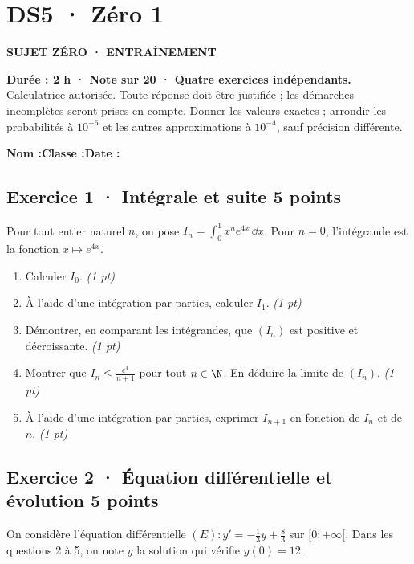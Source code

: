 \clearpage{}\label{sujet:7-1}

\section*{DS5 · Zéro 1}

{\sffamily\bfseries\color{teal}SUJET ZÉRO · ENTRAÎNEMENT\par}

\textbf{Durée : 2 h · Note sur 20 · Quatre exercices indépendants.}\\Calculatrice autorisée. Toute réponse doit être justifiée ; les démarches incomplètes seront prises en compte. Donner les valeurs exactes ; arrondir les probabilités à $10^{-6}$ et les autres approximations à $10^{-4}$, sauf précision différente.

\smallskip\textbf{Nom :}\enspace\dotfill\quad\textbf{Classe :}\enspace\dotfill\quad\textbf{Date :}\enspace\dotfill

\subsection*{Exercice 1 · Intégrale et suite \hfill 5 points}Pour tout entier naturel $n$, on pose $I_n=\displaystyle\int_0^1x^ne^{4x}\,\dd x$. Pour $n=0$, l'intégrande est la fonction $x\mapsto e^{4x}$.

\begin{enumerate}

\item Calculer $I_0$. \hfill\textit{(1 pt)}

\item À l'aide d'une intégration par parties, calculer $I_1$. \hfill\textit{(1 pt)}

\item Démontrer, en comparant les intégrandes, que $(I_n)$ est positive et décroissante. \hfill\textit{(1 pt)}

\item Montrer que $I_n\le\frac{e^{4}}{n+1}$ pour tout $n\in\N$. En déduire la limite de $(I_n)$. \hfill\textit{(1 pt)}

\item À l'aide d'une intégration par parties, exprimer $I_{n+1}$ en fonction de $I_n$ et de $n$. \hfill\textit{(1 pt)}

\end{enumerate}

\subsection*{Exercice 2 · Équation différentielle et évolution \hfill 5 points}On considère l'équation différentielle $(E):y'=-\frac1{3}y+\frac{8}{3}$ sur $[0;+\infty[$. Dans les questions 2 à 5, on note $y$ la solution qui vérifie $y(0)=12$.

